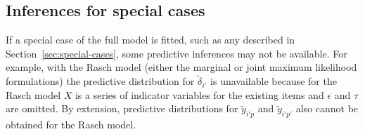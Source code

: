 \documentclass[12pt, letterpaper]{article}
\begin{document}
%
%


\subsection{Inferences for special cases}

If a special case of the full model is fitted, such as any described in Section~\ref{sec:special-cases}, some predictive inferences may not be available. 
For example, with the Rasch model (either the marginal or joint maximum likelihood formulations) the predictive distribution for $\tilde \delta_{i'}$ is unavailable because for the Rasch model $X$ is a series of indicator variables for the existing items and $\epsilon$ and $\tau$ are omitted. By extension, predictive distributions for $\tilde y_{i'p}$ and $\tilde y_{i'p'}$ also cannot be obtained for the Rasch model.
\end{document}
